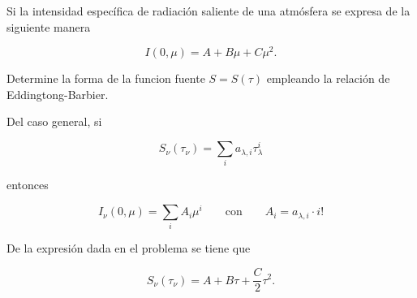 \documentclass[10pt,spanish,a4paper]{practice}
\begin{document}
    \begin{problem}
        Si la intensidad específica de radiación saliente de una atmósfera se  expresa de la siguiente manera

        $$
            I\left(0, \mu\right) = A + B \mu + C \mu^2.
        $$

        Determine la forma de la funcion fuente $S=S\left(\tau\right)$ empleando la relación de Eddingtong-Barbier.

        \begin{solution}
            Del caso general, si

            \begin{equation*}
                S_\nu(\tau_\nu) = \sum_i a_{\lambda, i} \tau_{\lambda}^{i}
            \end{equation*}

            entonces

            \begin{equation*}
                I_\nu(0,\mu) = \sum_i A_{i} \mu^{i} \qquad \mathrm{con} \qquad A_{i} = a_{\lambda, i} \cdot i!
            \end{equation*}

            De la expresión dada en el problema se tiene que

            \begin{equation*}
                S_\nu\left(\tau_\nu\right) = A + B \tau + \frac{C}{2} \tau^2.
            \end{equation*}
        \end{solution}
    \end{problem}
\end{document}
